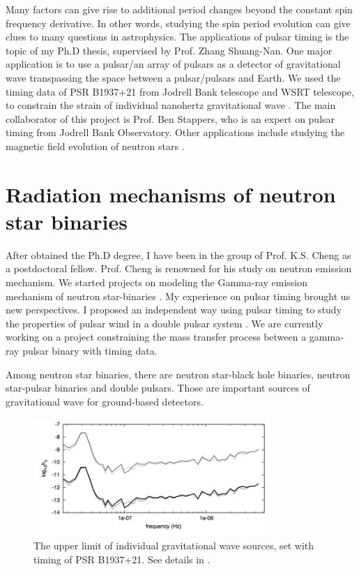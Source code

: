 \documentclass{article}
\begin{document}
Many factors can give rise to additional period changes beyond the constant spin frequency derivative. In other words, studying the spin period evolution can give clues to many questions in astrophysics. The applications of pulsar timing is the topic of my Ph.D thesis, supervised by Prof. Zhang Shuang-Nan. One major application is to use a pulsar/an array of pulsars as a detector of gravitational wave transpassing the space between a pulsar/pulsars and Earth. We used the timing data of PSR B1937+21 from Jodrell Bank telescope and WSRT telescope, to constrain the strain of individual nanohertz gravitational wave \citep{2014MNRAS.445.1245Y}. The main collaborator of this project is Prof. Ben Stappers, who is an expert on pulsar timing from Jodrell Bank Observatory. Other applications include studying the magnetic field evolution of neutron stars \citep{2015MNRAS.454.3674Y}. 

\section{Radiation mechanisms of neutron star binaries}
After obtained the Ph.D degree, I have been in the group of Prof. K.S. Cheng as a postdoctoral fellow. Prof. Cheng is renowned for his study on neutron emission mechanism. We started projects on modeling the Gamma-ray emission mechanism of neutron star-binaries \citep{2017ApJ...844..114Y, 2017arXiv170708263Y}. My experience on pulsar timing brought us new perspectives. I proposed an independent way using pulsar timing to study the properties of pulsar wind in a double pulsar system \citep{c}. We are currently working on a project constraining the mass transfer process between a gamma-ray pulsar binary with timing data. 

Among neutron star binaries, there are neutron star-black hole binaries, neutron star-pulsar binaries and double pulsars. Those are important sources of gravitational wave for ground-based detectors. 

\hspace*{- 4 cm}
\begin{figure}[t]
\centering
\includegraphics[width =9cm, trim=0 0 2.9cm 0cm]{GWlimit.png}
\caption{The upper limit of individual gravitational wave sources, set with timing of PSR B1937+21. See details in \citep{2014MNRAS.445.1245Y}.}
\end{figure}
\hspace*{- 4 cm}
\end{document}
